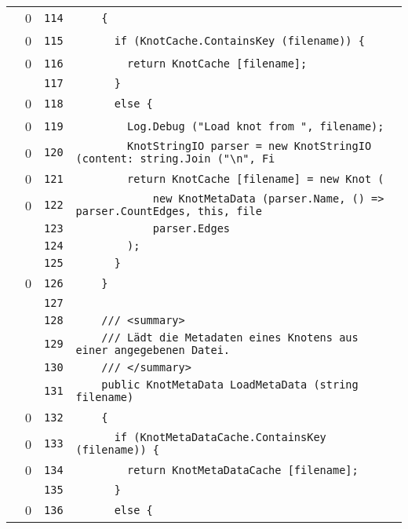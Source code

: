 \documentclass[a4paper,10pt]{article}
\begin{document}
\begin{longtable}[l]{lrrl}
\cellcolor{red} & 0 & \verb~114~ & \verb~    {~\\
\cellcolor{red} & 0 & \verb~115~ & \verb~      if (KnotCache.ContainsKey (filename)) {~\\
\cellcolor{red} & 0 & \verb~116~ & \verb~        return KnotCache [filename];~\\
\cellcolor{gray} &  & \verb~117~ & \verb~      }~\\
\cellcolor{red} & 0 & \verb~118~ & \verb~      else {~\\
\cellcolor{red} & 0 & \verb~119~ & \verb~        Log.Debug ("Load knot from ", filename);~\\
\cellcolor{red} & 0 & \verb~120~ & \verb~        KnotStringIO parser = new KnotStringIO (content: string.Join ("\n", Fi~\\
\cellcolor{red} & 0 & \verb~121~ & \verb~        return KnotCache [filename] = new Knot (~\\
\cellcolor{red} & 0 & \verb~122~ & \verb~            new KnotMetaData (parser.Name, () => parser.CountEdges, this, file~\\
\cellcolor{gray} &  & \verb~123~ & \verb~            parser.Edges~\\
\cellcolor{gray} &  & \verb~124~ & \verb~        );~\\
\cellcolor{gray} &  & \verb~125~ & \verb~      }~\\
\cellcolor{red} & 0 & \verb~126~ & \verb~    }~\\
\cellcolor{gray} &  & \verb~127~ & \verb~~\\
\cellcolor{gray} &  & \verb~128~ & \verb~    /// <summary>~\\
\cellcolor{gray} &  & \verb~129~ & \verb~    /// Lädt die Metadaten eines Knotens aus einer angegebenen Datei.~\\
\cellcolor{gray} &  & \verb~130~ & \verb~    /// </summary>~\\
\cellcolor{gray} &  & \verb~131~ & \verb~    public KnotMetaData LoadMetaData (string filename)~\\
\cellcolor{red} & 0 & \verb~132~ & \verb~    {~\\
\cellcolor{red} & 0 & \verb~133~ & \verb~      if (KnotMetaDataCache.ContainsKey (filename)) {~\\
\cellcolor{red} & 0 & \verb~134~ & \verb~        return KnotMetaDataCache [filename];~\\
\cellcolor{gray} &  & \verb~135~ & \verb~      }~\\
\cellcolor{red} & 0 & \verb~136~ & \verb~      else {~\\

\end{longtable}
\end{document}
